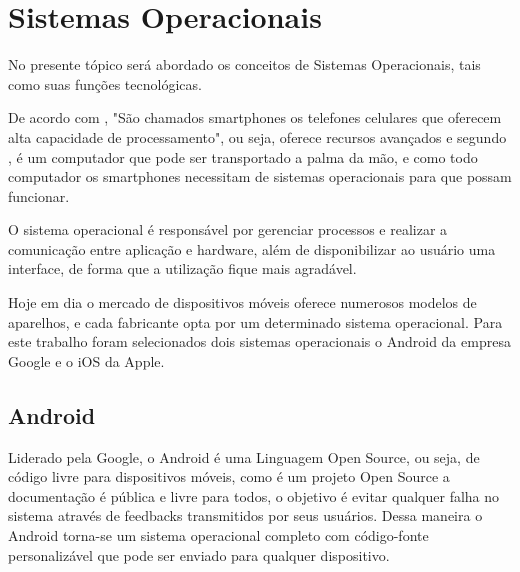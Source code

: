 


\section{Sistemas Operacionais}

No presente tópico será abordado os conceitos de Sistemas Operacionais, tais como suas funções tecnológicas.

De acordo com , "São chamados smartphones os telefones celulares que oferecem alta capacidade de processamento", ou seja, oferece recursos avançados e segundo , é um computador que pode ser transportado a palma da mão, e como todo computador os smartphones necessitam de sistemas operacionais para que possam funcionar.

O sistema operacional é responsável por gerenciar processos e realizar a comunicação entre aplicação e hardware, além de disponibilizar ao usuário uma interface, de forma que a utilização fique mais agradável. \cite {velloso2014informatica}

Hoje em dia o mercado de dispositivos móveis oferece numerosos modelos de aparelhos, e cada fabricante opta por um determinado sistema operacional. Para este trabalho foram selecionados dois sistemas operacionais o Android da empresa Google e o iOS da Apple. 

\subsection{Android}

Liderado pela Google, o Android é uma Linguagem Open Source, ou seja, de código livre para dispositivos móveis, como é um projeto Open Source a documentação é pública e livre para todos, o objetivo é evitar qualquer falha no sistema através de feedbacks transmitidos por seus usuários. Dessa maneira o Android torna-se um sistema operacional completo com código-fonte personalizável que pode ser enviado para qualquer dispositivo.

